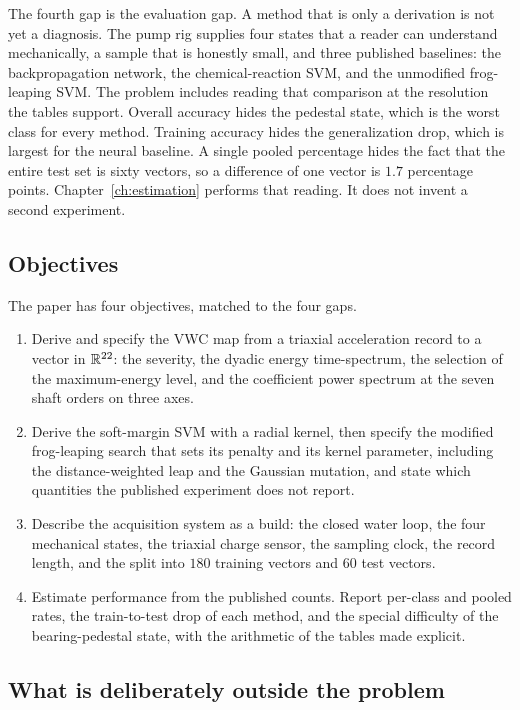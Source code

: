 The fourth gap is the evaluation gap.
A method that is only a derivation is not yet a diagnosis.
The pump rig supplies four states that a reader can understand mechanically, a sample that is honestly small, and three published baselines: the backpropagation network, the chemical-reaction SVM, and the unmodified frog-leaping SVM.
The problem includes reading that comparison at the resolution the tables support.
Overall accuracy hides the pedestal state, which is the worst class for every method.
Training accuracy hides the generalization drop, which is largest for the neural baseline.
A single pooled percentage hides the fact that the entire test set is sixty vectors, so a difference of one vector is \(1.7\) percentage points.
Chapter~\ref{ch:estimation} performs that reading.
It does not invent a second experiment.

\subsection{Objectives}

The paper has four objectives, matched to the four gaps.

\begin{enumerate}
\item Derive and specify the VWC map from a triaxial acceleration record to a vector in \(\mathbb{R}^{22}\): the severity, the dyadic energy time-spectrum, the selection of the maximum-energy level, and the coefficient power spectrum at the seven shaft orders on three axes.
\item Derive the soft-margin SVM with a radial kernel, then specify the modified frog-leaping search that sets its penalty and its kernel parameter, including the distance-weighted leap and the Gaussian mutation, and state which quantities the published experiment does not report.
\item Describe the acquisition system as a build: the closed water loop, the four mechanical states, the triaxial charge sensor, the sampling clock, the record length, and the split into \(180\) training vectors and \(60\) test vectors.
\item Estimate performance from the published counts.
Report per-class and pooled rates, the train-to-test drop of each method, and the special difficulty of the bearing-pedestal state, with the arithmetic of the tables made explicit.
\end{enumerate}

\subsection{What is deliberately outside the problem}

